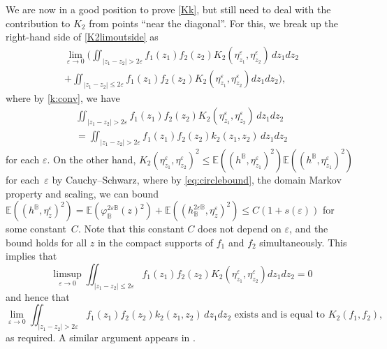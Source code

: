 \documentclass[10pt]{amsart}
\theoremstyle{definition}
\newcommand{\E}{\mathbb{E}}
\newcommand{\B}{\mathbb{B}}\let\D\B\let\Ub\B
\let\eps\varepsilon
\begin{document}
We are now in a good position to prove \eqref{Kk}, but still need to deal with the contribution to $K_2$ from points ``near the diagonal''. For this, we break up the right-hand side of \eqref{K2limoutside} as
\begin{multline*}
\lim_{\eps\to 0} \biggl(\iint_{|z_1-z_2|>2\eps}f_1(z_1)f_2(z_2)K_2(\eta_{z_1}^\eps, \eta_{z_2}^\eps)\, dz_1 dz_2\\ + \iint_{|z_1-z_2|\le 2\eps}f_1(z_1)f_2(z_2)K_2(\eta_{z_1}^\eps, \eta_{z_2}^\eps) dz_1 dz_2\biggr),
\end{multline*}
where by
\eqref{k:conv}, we have
\begin{multline*}
\iint_{|z_1-z_2|>2\eps}f_1(z_1)f_2(z_2)K_2(\eta_{z_1}^\eps, \eta_{z_2}^\eps)\, dz_1 dz_2\\
= \iint_{|z_1-z_2|>2\eps}f_1(z_1)f_2(z_2)k_2(z_1,z_2)\, dz_1 dz_2
\end{multline*}
for each $\eps$. On the other hand, $K_2(\eta_{z_1}^\eps, \eta_{z_2}^\eps)^2\le {\E((h^\B,\eta_{z_1}^\eps)^2)\E((h^\B,\eta_{z_1}^\eps)^2)}$ for each~$\eps$ by Cauchy--Schwarz, where by \eqref{eq:circlebound}, the domain Markov property and scaling, we can bound $\E((h^\B,\eta_{z}^\eps)^2)=\E(\varphi_\B^{2\eps\B}(z)^2)+\E((h_\B^{2\eps\B},\eta_z^\eps)^2)\le C(1+s(\eps))$ for some constant~$C$. Note that this constant $C$ does not depend on $\eps$, and the bound holds for all $z$ in the compact supports of $f_1$ and $f_2$ simultaneously. This implies that
\[
\limsup_{\eps\to 0} \iint_{|z_1-z_2|\le 2\eps}f_1(z_1)f_2(z_2)K_2(\eta_{z_1}^\eps, \eta_{z_2}^\eps) dz_1 dz_2=0
\]
and hence that
\[
\lim_{\eps\to 0} \iint_{|z_1-z_2|>2\eps}f_1(z_1)f_2(z_2)k_2(z_1,z_2)\, dz_1 dz_2 \text{ exists and is equal to } K_2(f_1,f_2),
\]
as required. A similar argument appears in \cite[Proof of Lem.\,2.18]{BPR18}.
\end{document}

